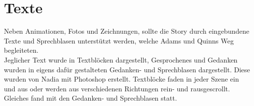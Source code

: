 \section{Texte}
Neben Animationen, Fotos und Zeichnungen, sollte die Story durch eingebundene Texte und Sprechblasen unterstützt werden, welche Adams und Quinns Weg begleiteten. \\
Jeglicher Text wurde in Textblöcken dargestellt, Gesprochenes und Gedanken wurden in eigens dafür gestalteten Gedanken- und Sprechblasen dargestellt. Diese wurden von Nadia mit Photoshop erstellt. 
Textblöcke faden in jeder Szene ein und aus oder werden aus verschiedenen Richtungen rein- und rausgescrollt. Gleiches fand mit den Gedanken- und Sprechblasen statt.